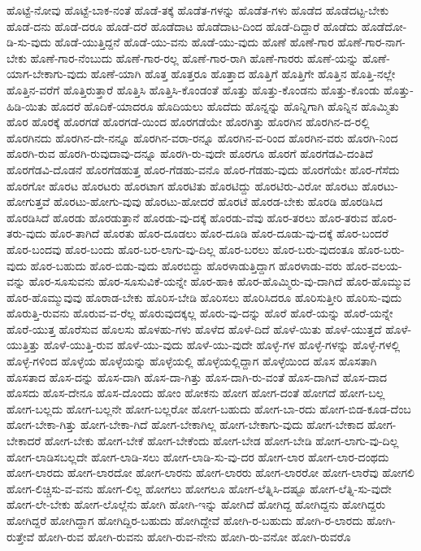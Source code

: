 {ಹೊಟ್ಟೆ-ನೋವು
ಹೊಟ್ಟೆ-ಬಾಕ-ನಂತೆ
ಹೊಡೆ-ತಕ್ಕೆ
ಹೊಡೆತ-ಗಳನ್ನು
ಹೊಡೆತ-ಗಳು
ಹೊಡೆದ
ಹೊಡೆದಟ್ಟ-ಬೇಕು
ಹೊಡೆ-ದನು
ಹೊಡೆ-ದರೂ
ಹೊಡೆ-ದರೆ
ಹೊಡೆದಾಟ
ಹೊಡೆದಾಟ-ದಿಂದ
ಹೊಡೆ-ದಿದ್ದಾರೆ
ಹೊಡೆದು
ಹೊಡೆದೋ-ಡಿ-ಸು-ವುದು
ಹೊಡೆ-ಯುತ್ತಿದ್ದನೆ
ಹೊಡೆ-ಯು-ವನು
ಹೊಡೆ-ಯು-ವುದು
ಹೊಣೆ
ಹೊಣೆ-ಗಾರ
ಹೊಣೆ-ಗಾರ-ನಾಗ-ಬೇಕು
ಹೊಣೆ-ಗಾರ-ನೆಂಬುದು
ಹೊಣೆ-ಗಾರ-ರಲ್ಲ
ಹೊಣೆ-ಗಾರ-ರಾಗಿ
ಹೊಣೆ-ಗಾರರು
ಹೊಣೆ-ಯನ್ನು
ಹೊಣೆ-ಯಾಗ-ಬೇಕಾಗು-ವುದು
ಹೊಣೆ-ಯಾಗಿ
ಹೊತ್ತ
ಹೊತ್ತರೂ
ಹೊತ್ತಾದ
ಹೊತ್ತಿಗೆ
ಹೊತ್ತಿಗೇ
ಹೊತ್ತಿನ
ಹೊತ್ತಿ-ನಲ್ಲೇ
ಹೊತ್ತಿನ-ವರೆಗೆ
ಹೊತ್ತಿರುತ್ತಾರೆ
ಹೊತ್ತಿಸಿ
ಹೊತ್ತಿಸಿ-ಕೊಂಡಂತೆ
ಹೊತ್ತು
ಹೊತ್ತು-ಕೊಂಡನು
ಹೊತ್ತು-ಕೊಂಡು
ಹೊತ್ತು-ಹಿಡಿ-ಯಿತು
ಹೊದರೆ
ಹೊದಿಕೆ-ಯಾದರೂ
ಹೊದಿಯಲು
ಹೊದೆದು
ಹೊನ್ನನ್ನು
ಹೊನ್ನಿಗಾಗಿ
ಹೊನ್ನಿನ
ಹೊಮ್ಮಿತು
ಹೊರ
ಹೊರಕ್ಕೆ
ಹೊರಗಡೆ
ಹೊರಗಡೆ-ಯಿಂದ
ಹೊರಗಡೆಯೇ
ಹೊರಗಿತ್ತು
ಹೊರಗಿನ
ಹೊರಗಿನ-ದ-ರಲ್ಲಿ
ಹೊರಗಿನದು
ಹೊರಗಿನ-ದೇ-ನನ್ನೂ
ಹೊರಗಿನ-ವರಾ-ರನ್ನೂ
ಹೊರಗಿನ-ವ-ರಿಂದ
ಹೊರಗಿನ-ವರು
ಹೊರಗಿ-ನಿಂದ
ಹೊರಗಿ-ರುವ
ಹೊರಗಿ-ರುವುದಾವು-ದನ್ನೂ
ಹೊರಗಿ-ರು-ವುದೇ
ಹೊರಗೂ
ಹೊರಗೆ
ಹೊರಗೆಡವಿ-ದಂತಿದೆ
ಹೊರಗೆಡವಿ-ದೊಡನೆ
ಹೊರಗೆಡಹುತ್ತ
ಹೊರ-ಗೆಡಹು-ವನೊ
ಹೊರ-ಗೆಡಹು-ವುದು
ಹೊರಗೆಯೇ
ಹೊರ-ಗೆಸೆದು
ಹೊರಗೋ
ಹೊರಟ
ಹೊರಟರು
ಹೊರಟಾಗ
ಹೊರಟಿತು
ಹೊರಟಿದ್ದು
ಹೊರಟಿರು-ವಿರೋ
ಹೊರಟು
ಹೊರಟು-ಹೋಗುತ್ತವೆ
ಹೊರಟು-ಹೋಗು-ವುವು
ಹೊರಟು-ಹೋದರೆ
ಹೊರಟೆ
ಹೊರಡ-ಬೇಕು
ಹೊರಡಿ
ಹೊರಡಿಸಿದ
ಹೊರಡಿಸಿದೆ
ಹೊರಡು
ಹೊರಡುತ್ತಾನೆ
ಹೊರಡು-ವು-ದಕ್ಕೆ
ಹೊರಡು-ವೆವು
ಹೊರ-ತರಲು
ಹೊರ-ತರುವ
ಹೊರ-ತರು-ವುದು
ಹೊರ-ತಾಗಿದೆ
ಹೊರತು
ಹೊರ-ದೂಡಲು
ಹೊರ-ದೂಡಿ
ಹೊರ-ದೂಡು-ವು-ದಕ್ಕೆ
ಹೊರ-ಬಂದರೆ
ಹೊರ-ಬಂದವು
ಹೊರ-ಬಂದು
ಹೊರ-ಬರ-ಲಾಗು-ವು-ದಿಲ್ಲ
ಹೊರ-ಬರಲು
ಹೊರ-ಬರು-ವುದಂತೂ
ಹೊರ-ಬರು-ವುದು
ಹೊರ-ಬಹುದು
ಹೊರ-ಬಿಡು-ವುದು
ಹೊರಬಿದ್ದು
ಹೊರಳಾಡುತ್ತಿದ್ದಾಗ
ಹೊರಳಾಡು-ವರು
ಹೊರ-ವಲಯ-ವನ್ನು
ಹೊರ-ಸೂಸುವನು
ಹೊರ-ಸೂಸುವಿಕೆ-ಯನ್ನೇ
ಹೊರ-ಹಾಕಿ
ಹೊರ-ಹೊಮ್ಮಿರು-ವು-ದಾಗಿದೆ
ಹೊರ-ಹೊಮ್ಮುವ
ಹೊರ-ಹೊಮ್ಮುವುವು
ಹೊರಾಡ-ಬೇಕು
ಹೊರಿಸ-ಬೇಡಿ
ಹೊರಿಸಲು
ಹೊರಿಸಿದರೂ
ಹೊರಿಸುತ್ತೀರಿ
ಹೊರಿಸು-ವುದು
ಹೊರುತ್ತಿ-ರುವನು
ಹೊರುವ-ವ-ರೆಲ್ಲ
ಹೊರುವುದಕ್ಕಲ್ಲ
ಹೊರು-ವು-ದನ್ನು
ಹೊರೆ
ಹೊರೆ-ಯನ್ನು
ಹೊರೆ-ಯನ್ನೇ
ಹೊರೆ-ಯುತ್ತ
ಹೊರೆಸುವ
ಹೊಲಸು
ಹೊಳಹು-ಗಳು
ಹೊಳೆದ
ಹೊಳೆ-ದಿದೆ
ಹೊಳೆ-ಯಿತು
ಹೊಳೆ-ಯುತ್ತದೆ
ಹೊಳೆ-ಯುತ್ತಿತ್ತು
ಹೊಳೆ-ಯುತ್ತಿ-ರುವ
ಹೊಳೆ-ಯು-ವುದು
ಹೊಳೆ-ಯು-ವುದೇ
ಹೊಳ್ಳೆ-ಗಳ
ಹೊಳ್ಳೆ-ಗಳನ್ನು
ಹೊಳ್ಳೆ-ಗಳಲ್ಲಿ
ಹೊಳ್ಳೆ-ಗಳಿಂದ
ಹೊಳ್ಳೆಯ
ಹೊಳ್ಳೆಯನ್ನು
ಹೊಳ್ಳೆಯಲ್ಲಿ
ಹೊಳ್ಳೆಯಲ್ಲಿದ್ದಾಗ
ಹೊಳ್ಳೆಯಿಂದ
ಹೊಸ
ಹೊಸತಾಗಿ
ಹೊಸತಾದ
ಹೊಸ-ದನ್ನು
ಹೊಸ-ದಾಗಿ
ಹೊಸ-ದಾ-ಗಿತ್ತು
ಹೊಸ-ದಾಗಿ-ರು-ವಂತೆ
ಹೊಸ-ದಾಗಿವೆ
ಹೊಸ-ದಾದ
ಹೊಸದು
ಹೊಸ-ದೇನೂ
ಹೊಸ-ದೊಂದು
ಹೋಂ
ಹೋಕನು
ಹೋಗ
ಹೋಗ-ದಂತೆ
ಹೋಗದೆ
ಹೋಗ-ಬಲ್ಲ
ಹೋಗ-ಬಲ್ಲದು
ಹೋಗ-ಬಲ್ಲನೇ
ಹೋಗ-ಬಲ್ಲರೋ
ಹೋಗ-ಬಹುದು
ಹೋಗ-ಬಾ-ರದು
ಹೋಗ-ಬಿಡ-ಕೂಡ-ದೆಂಬ
ಹೋಗ-ಬೇಕಾ-ಗಿತ್ತು
ಹೋಗ-ಬೇಕಾ-ಗಿದೆ
ಹೋಗ-ಬೇಕಾಗಿಲ್ಲ
ಹೋಗ-ಬೇಕಾಗು-ವುದು
ಹೋಗ-ಬೇಕಾದ
ಹೋಗ-ಬೇಕಾದರೆ
ಹೋಗ-ಬೇಕು
ಹೋಗ-ಬೇಕೆ
ಹೋಗ-ಬೇಕೆಂದು
ಹೋಗ-ಬೇಡ
ಹೋಗ-ಬೇಡಿ
ಹೋಗ-ಲಾಗು-ವು-ದಿಲ್ಲ
ಹೋಗ-ಲಾಡಿಸಬಲ್ಲದೇ
ಹೋಗ-ಲಾಡಿ-ಸಲು
ಹೋಗ-ಲಾಡಿ-ಸು-ವು-ದರ
ಹೋಗ-ಲಾರ
ಹೋಗ-ಲಾರ-ದಂಥದು
ಹೋಗ-ಲಾರದು
ಹೋಗ-ಲಾರದೋ
ಹೋಗ-ಲಾರನು
ಹೋಗ-ಲಾರರು
ಹೋಗ-ಲಾರರೋ
ಹೋಗ-ಲಾರೆವು
ಹೋಗಲಿ
ಹೋಗ-ಲಿಚ್ಚಿಸು-ವ-ವನು
ಹೋಗ-ಲಿಲ್ಲ
ಹೋಗಲು
ಹೋಗಲೂ
ಹೋಗ-ಲೆತ್ನಿಸಿ-ದಷ್ಟೂ
ಹೋಗ-ಲೆತ್ನಿ-ಸು-ವುದೇ
ಹೋಗ-ಲೇ-ಬೇಕು
ಹೋಗ-ಲೊಲ್ಲೆನು
ಹೋಗಿ
ಹೋಗಿ-ಇನ್ನು
ಹೋಗಿದೆ
ಹೋಗಿದ್ದ
ಹೋಗಿದ್ದನು
ಹೋಗಿದ್ದರು
ಹೋಗಿದ್ದರೆ
ಹೋಗಿದ್ದಾಗ
ಹೋಗಿದ್ದಿರ-ಬಹುದು
ಹೋಗಿದ್ದೇವೆ
ಹೋಗಿ-ರ-ಬಹುದು
ಹೋಗಿ-ರ-ಲಾರದು
ಹೋಗಿ-ರುತ್ತೇವೆ
ಹೋಗಿ-ರುವ
ಹೋಗಿ-ರುವನು
ಹೋಗಿ-ರುವ-ನೇನು
ಹೋಗಿ-ರು-ವನೋ
ಹೋಗಿ-ರುವರೊ
}

